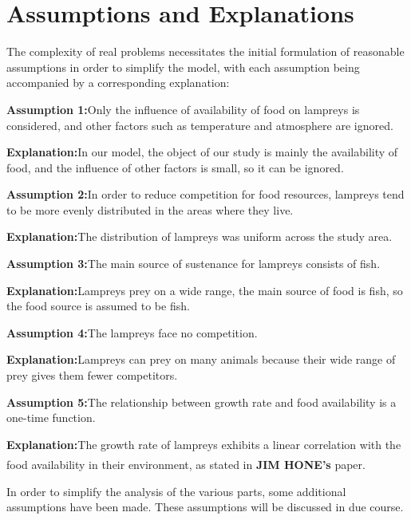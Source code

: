 \documentclass[12pt]{article}  %
\newcommand{\upcite}[1]{\textsuperscript{\textsuperscript{\cite{#1}}}}
\begin{document}
\section{Assumptions and Explanations}
The complexity of real problems necessitates the initial formulation of reasonable assumptions in order to simplify the model, with each assumption being accompanied by a corresponding explanation:

\textbf{Assumption 1:}Only the influence of availability of food on lampreys is considered, and other factors such as temperature and atmosphere are ignored.

\textbf{Explanation:}In our model, the object of our study is mainly the availability of food, and the influence of other factors is small, so it can be ignored.


\textbf{Assumption 2:}In order to reduce competition for food resources, lampreys tend to be more evenly distributed in the areas where they live.

\textbf{Explanation:}The distribution of lampreys was uniform across the study area.

\textbf{Assumption 3:}The main source of sustenance for lampreys consists of fish.

\textbf{Explanation:}Lampreys prey on a wide range, the main source of food is fish, so the food source is assumed to be fish.

\textbf{Assumption 4:}The lampreys face no competition.

\textbf{Explanation:}Lampreys can prey on many animals because their wide range of prey gives them fewer competitors.


\textbf{Assumption 5:}The relationship between growth rate and food availability is a one-time function.

\textbf{Explanation:}The growth rate of lampreys exhibits a linear correlation with the food availability in their environment, as stated in \textbf{JIM HONE's}\upcite{2} paper.

In order to simplify the analysis of the various parts, some additional assumptions have been made. These assumptions will be discussed in due course.
\end{document}
